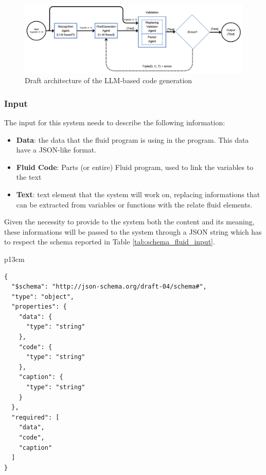 \begin{figure}
    \centering
    \includegraphics[width=0.95\linewidth]{fig/fluid-llm-architecture.png}
    \caption{Draft architecture of the LLM-based code generation}
    \label{fig:fluid-llm-architecture}
\end{figure}

\subsubsection{Input}
The input for this system needs to describe the following information:
\begin{itemize}
    \item \textbf{Data}: the data that the fluid program is using in the program. This data have a JSON-like format.
    \item \textbf{Fluid Code}: Parts (or entire) Fluid program, used to link the variables to the text
    \item \textbf{Text}: text element that the system will work on, replacing informations that can be extracted from variables or functions with the relate fluid elements.
\end{itemize}

Given the necessity to provide to the system both the content and its meaning, these informations will be passed to the system through a JSON string which has to respect the schema reported in Table \ref{tab:schema_fluid_input}.

\begin{table}[!ht]
    \centering
    \caption{Input JSON Schema \label{tab:schema_fluid_input}}
    \begin{tabular}{p{13cm}}
    \hline
    \hline
    \begin{verbatim}
{
  "$schema": "http://json-schema.org/draft-04/schema#",
  "type": "object",
  "properties": {
    "data": {
      "type": "string"
    },
    "code": {
      "type": "string"
    },
    "caption": {
      "type": "string"
    }
  },
  "required": [
    "data",
    "code",
    "caption"
  ]
}
    \end{verbatim}\\
    \hline \hline
    \end{tabular}
\end{table}

